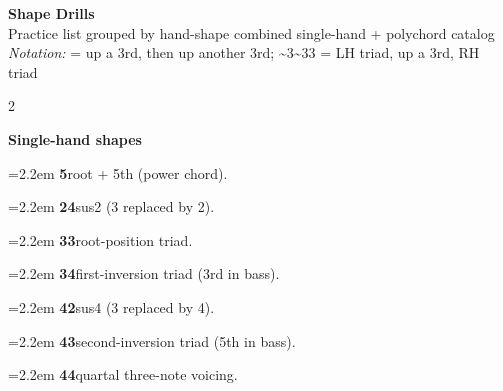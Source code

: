 \documentclass[12pt]{article}
\begin{document}
{\centering
{\Large\bfseries Shape Drills} \\
{\small Practice list grouped by hand-shape \textemdash{} combined single-hand + polychord catalog \\
\textit{Notation:} {} = up a 3rd, then up another 3rd; {\textasciitilde{}3\textasciitilde{}33} = LH triad, up a 3rd, RH triad}
\par}
\vspace{0.5em}
\begin{multicols}{2}
\raggedright
\noindent\textbf{\large Single-hand shapes}\par\vspace{0.15em}
\noindent\hangindent=2.2em {\juliamono\bfseries 5}\enspace\textemdash\enspace root + 5th (power chord).\par
\noindent\hangindent=2.2em {\juliamono\bfseries 24}\enspace\textemdash\enspace sus2 (3 replaced by 2).\par
\noindent\hangindent=2.2em {\juliamono\bfseries 33}\enspace\textemdash\enspace root-position triad.\par
\noindent\hangindent=2.2em {\juliamono\bfseries 34}\enspace\textemdash\enspace first-inversion triad (3rd in bass).\par
\noindent\hangindent=2.2em {\juliamono\bfseries 42}\enspace\textemdash\enspace sus4 (3 replaced by 4).\par
\noindent\hangindent=2.2em {\juliamono\bfseries 43}\enspace\textemdash\enspace second-inversion triad (5th in bass).\par
\noindent\hangindent=2.2em {\juliamono\bfseries 44}\enspace\textemdash\enspace quartal three-note voicing.\par

\end{multicols}
\end{document}
